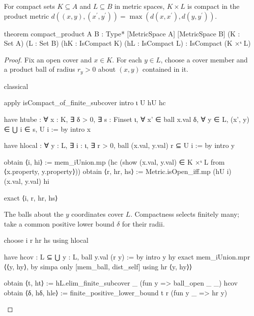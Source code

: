 \begin{lemma}
  \label{ma:lem:compact-product}
  For compact sets $K\subseteq A$ and $L\subseteq B$ in metric spaces, $K\times L$ is compact in
  the product metric $d((x,y),(x^{\prime},y^{\prime}))=\max(d(x,x^{\prime}),d(y,y^{\prime}))$.

  \begin{lean}
    theorem compact_product {A B : Type*} [MetricSpace A] [MetricSpace B]
        (K : Set A) (L : Set B) (hK : IsCompact K) (hL : IsCompact L) :
        IsCompact (K ×ˢ L)
  \end{lean}
\end{lemma}

\begin{proof}
  Fix an open cover and $x\in K$.
  For each $y\in L$, choose a cover member and a product ball of radius $r_y>0$ about $(x,y)$
  contained in it.

  \begin{lean}
    classical

    apply isCompact_of_finite_subcover
    intro ι U hU hc

    have htube : ∀ x : K, ∃ δ > 0, ∃ s : Finset ι,
        ∀ x' ∈ ball x.val δ, ∀ y ∈ L, (x', y) ∈ ⋃ i ∈ s, U i := by
      intro x

      have hlocal : ∀ y : L, ∃ i : ι, ∃ r > 0, ball (x.val, y.val) r ⊆ U i := by
        intro y

        obtain ⟨i, hi⟩ := mem_iUnion.mp
          (hc (show (x.val, y.val) ∈ K ×ˢ L from ⟨x.property, y.property⟩))
        obtain ⟨r, hr, hs⟩ := Metric.isOpen_iff.mp (hU i) (x.val, y.val) hi

        exact ⟨i, r, hr, hs⟩
  \end{lean}

  The balls about the $y$ coordinates cover $L$.
  Compactness selects finitely many; take a common positive lower bound $\delta$ for their radii.

  \begin{lean}
    choose i r hr hs using hlocal

    have hcov : L ⊆ ⋃ y : L, ball y.val (r y) := by
      intro y hy
      exact mem_iUnion.mpr ⟨⟨y, hy⟩, by simpa only [mem_ball, dist_self] using hr ⟨y, hy⟩⟩

    obtain ⟨t, ht⟩ := hL.elim_finite_subcover _ (fun y => ball_open _ _) hcov
    obtain ⟨δ, hδ, hle⟩ := finite_positive_lower_bound t r (fun y _ => hr y)
  \end{lean}


\end{proof}
